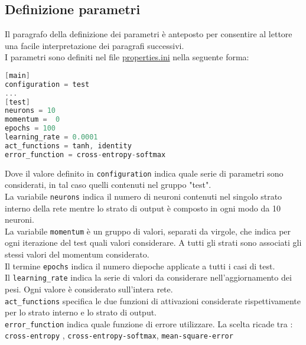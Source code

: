 \subsection{Definizione parametri}
Il paragrafo della definizione dei parametri è anteposto per consentire al lettore una facile interpretazione dei paragrafi successivi. \\
I parametri sono definiti nel file \underline{properties.ini} nella seguente forma:
\begin{lstlisting}[language=C]
[main]
configuration = test
...
[test]
neurons = 10
momentum =  0
epochs = 100
learning_rate = 0.0001
act_functions = tanh, identity
error_function = cross-entropy-softmax
\end{lstlisting}
Dove il valore definito in \texttt{configuration} indica quale serie di parametri sono considerati, in tal caso quelli contenuti nel gruppo "test". \\
La variabile \texttt{neurons} indica il numero di neuroni contenuti nel singolo strato interno della rete mentre lo strato di output è composto in ogni modo da 10 neuroni.\\
La variabile \texttt{momentum} è un gruppo di valori, separati da virgole, che indica per ogni iterazione del test quali valori considerare. A tutti gli strati sono associati gli stessi valori del momentum considerato. \\
Il termine \texttt{epochs} indica il numero diepoche applicate a tutti i casi di test. \\
Il \texttt{learning\_rate} indica la serie di valori da considerare nell'aggiornamento dei pesi. Ogni valore è considerato sull'intera rete. \\
\texttt{act\_functions} specifica le due funzioni di attivazioni considerate rispettivamente per lo strato interno e lo strato di output. \\
\texttt{error\_function} indica quale funzione di errore utilizzare. La scelta ricade tra : \texttt{cross-entropy} , \texttt{cross-entropy-softmax}, \texttt{mean-square-error}

